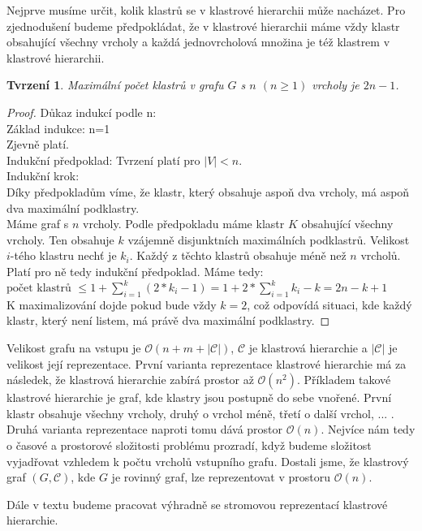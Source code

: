 \documentclass[12pt,a4report]{report}
\newtheorem{tvr}[theorem]{Tvrzení}
\theoremstyle{definition}
\begin{document}
Nejprve musíme určit, kolik klastrů se v klastrové hierarchii může nacházet.
Pro zjednodušení budeme předpokládat, že v klastrové hierarchii máme vždy klastr obsahující všechny vrcholy a každá jednovrcholová množina je též klastrem v klastrové hierarchii.
\begin{tvr}
Maximální počet klastrů v grafu $G$ s $n$ $(n \geq 1)$ vrcholy je $2n-1$.
\end{tvr}
\begin{proof}
Důkaz indukcí podle n: \\
Základ indukce: n=1 \\
Zjevně platí. \\
Indukční předpoklad: Tvrzení platí pro $|V| < n$.\\
Indukční krok:  \\
Díky předpokladům víme, že klastr, který obsahuje aspoň dva vrcholy, má aspoň dva maximální podklastry. \\
Máme graf s $n$ vrcholy. Podle předpokladu máme klastr $K$ obsahující všechny vrcholy. Ten obsahuje $k$ vzájemně disjunktních maximálních podklastrů. Velikost $i$-tého klastru nechť je $k_i$. Každý z těchto klastrů obsahuje méně než $n$ vrcholů. Platí pro ně tedy indukční předpoklad. Máme tedy: \\
$\text{počet klastrů } \leq 1 + \sum\limits_{i=1}^k (2*k_i-1) = 1 + 2*\sum\limits_{i=1}^k k_i - k = 2n - k + 1 $\\
K maximalizování dojde pokud bude vždy $k=2$, což odpovídá situaci, kde každý klastr, který není listem, má právě dva maximální podklastry.
\end{proof}

Velikost grafu na vstupu je  $\mathcal{O}(n+m+| \mathcal C|)$, $\mathcal C$ je klastrová hierarchie a $| \mathcal C|$ je velikost její reprezentace. První varianta reprezentace klastrové hierarchie má za následek, že klastrová hierarchie zabírá prostor až $\mathcal{O}(n^2)$. Příkladem takové klastrové hierarchie je graf, kde klastry jsou postupně do sebe vnořené. První klastr obsahuje všechny vrcholy, druhý o vrchol méně, třetí o další vrchol, ... .
Druhá varianta reprezentace naproti tomu dává prostor $\mathcal{O}(n)$. Nejvíce nám tedy o časové a prostorové složitosti problému prozradí, když budeme složitost vyjadřovat vzhledem k počtu vrcholů vstupního grafu. Dostali jsme, že klastrový graf $(G,\mathcal C )$, kde $G$ je rovinný graf, lze reprezentovat v prostoru $\mathcal O (n)$.

Dále v textu budeme pracovat výhradně se stromovou reprezentací klastrové hierarchie.
\end{document}
